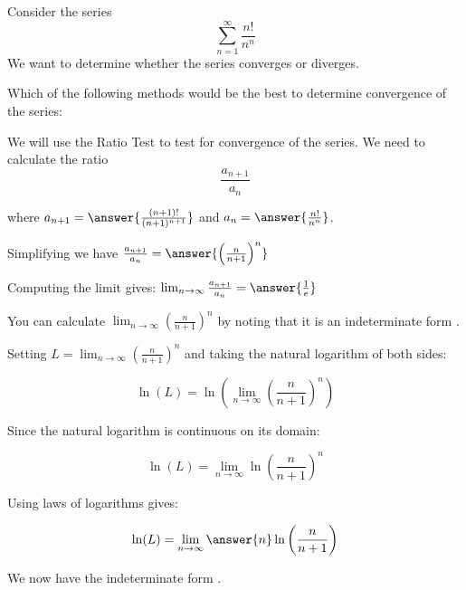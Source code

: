 \documentclass{ximera}
\author{Jim Talamo}
\begin{document}
\begin{exercise}

Consider the series 
\[
\sum^{\infty}_{n=1}\frac{n!}{n^n}
\]
We want to determine whether the series converges or diverges. 


Which of the following methods would be the best to determine convergence of the series:

\begin{multipleChoice}
\end{multipleChoice}





\begin{exercise}

We will use the Ratio Test to test for convergence of the series. 
We need to calculate the ratio
\[
\frac{a_{n+1}}{a_n}
\]

where $a_{n+1}=\answer{ \frac{(n+1)!}{(n+1)^{n+1}}}$ and $a_n=\answer{\frac{n!}{n^n}}$. 

Simplifying we have $ \frac{a_{n+1}}{a_n}=\answer{  \left(\frac{n}{n+1}\right)^n}$

Computing the limit gives: $\lim_{n\to \infty}  \frac{a_{n+1}}{a_n}  =\answer{ \frac{1}{e} }$

\begin{hint}
You can calculate $\lim_{n \to \infty} \left(\frac{n}{n+1} \right)^n$ by noting that it is an indeterminate form .

Setting $L=\lim_{n \to \infty} \left(\frac{n}{n+1} \right)^n$ and taking the natural logarithm of both sides:

\[
\ln(L) = \ln \left(\lim_{n \to \infty} \left(\frac{n}{n+1} \right)^n\right)
\]

Since the natural logarithm is continuous on its domain:

\[
\ln(L) =\lim_{n \to \infty}  \ln \left(\frac{n}{n+1} \right)^n
\]

Using laws of logarithms gives:

\[
\ln(L) =\lim_{n \to \infty}  \answer{n} \ln \left(\frac{n}{n+1} \right)
\]

We now have the indeterminate form .


\end{hint}
\end{exercise}
\end{exercise}
\end{document}

